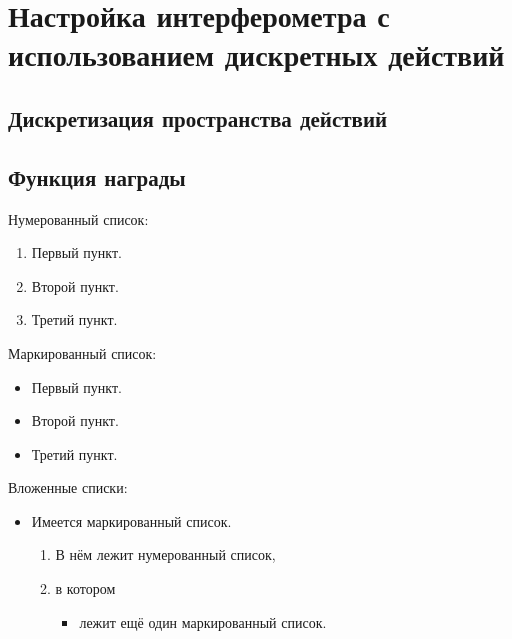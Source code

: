 \section{Настройка интерферометра с использованием дискретных действий}\label{sec:ch2/sec3}

\subsection{Дискретизация пространства действий}
\subsection{Функция награды}

\noindent Нумерованный список:
\begin{enumerate}
    \item Первый пункт.
    \item Второй пункт.
    \item Третий пункт.
\end{enumerate}

\noindent Маркированный список:
\begin{itemize}
    \item Первый пункт.
    \item Второй пункт.
    \item Третий пункт.
\end{itemize}

\noindent Вложенные списки:
\begin{itemize}
    \item Имеется маркированный список.
          \begin{enumerate}
              \item В нём лежит нумерованный список,
              \item в котором
                    \begin{itemize}
                        \item лежит ещё один маркированный список.
                    \end{itemize}
          \end{enumerate}
\end{itemize}

